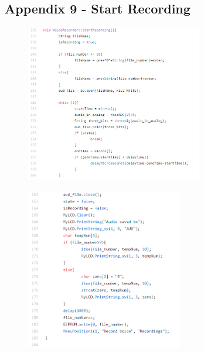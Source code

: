 \documentclass[11pt]{article}
\begin{document}
\begin{figure}
\subsection{Appendix 9 - Start Recording}
    \begin{subfigure}{\textwidth}
    \centering
    \includegraphics[width=0.85\textwidth]{Images/start_4.png}
    \end{subfigure}    
    
    \begin{subfigure}{\textwidth}
    \centering
    \includegraphics[width=0.75\textwidth]{Images/start_5.png}
    \end{subfigure}    
\end{figure}
\end{document}
